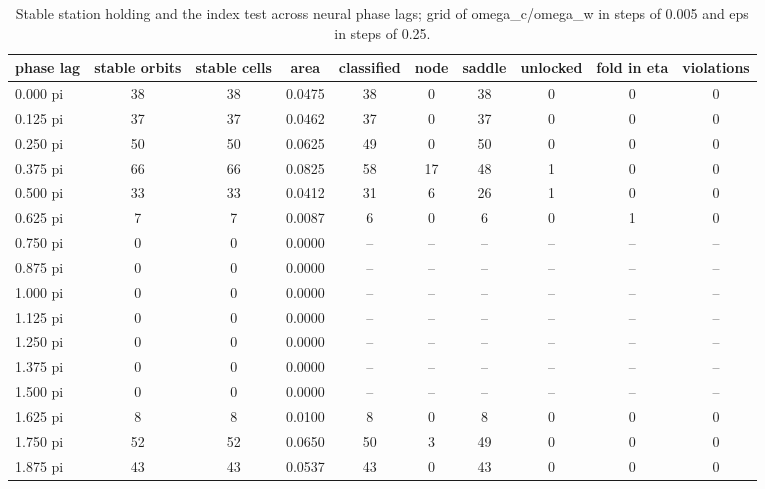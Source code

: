 \begin{table}
\caption{Stable station holding and the index test across neural phase lags; grid of omega_c/omega_w in steps of 0.005 and eps in steps of 0.25.}
\label{tab:T_phase_lag_sweep}
\begin{ruledtabular}
\begin{tabular}{lccccccccc}
phase lag & stable orbits & stable cells & area & classified & node & saddle & unlocked & fold in eta & violations \\
\hline
0.000 pi & 38 & 38 & 0.0475 & 38 & 0 & 38 & 0 & 0 & 0 \\
0.125 pi & 37 & 37 & 0.0462 & 37 & 0 & 37 & 0 & 0 & 0 \\
0.250 pi & 50 & 50 & 0.0625 & 49 & 0 & 50 & 0 & 0 & 0 \\
0.375 pi & 66 & 66 & 0.0825 & 58 & 17 & 48 & 1 & 0 & 0 \\
0.500 pi & 33 & 33 & 0.0412 & 31 & 6 & 26 & 1 & 0 & 0 \\
0.625 pi & 7 & 7 & 0.0087 & 6 & 0 & 6 & 0 & 1 & 0 \\
0.750 pi & 0 & 0 & 0.0000 & -- & -- & -- & -- & -- & -- \\
0.875 pi & 0 & 0 & 0.0000 & -- & -- & -- & -- & -- & -- \\
1.000 pi & 0 & 0 & 0.0000 & -- & -- & -- & -- & -- & -- \\
1.125 pi & 0 & 0 & 0.0000 & -- & -- & -- & -- & -- & -- \\
1.250 pi & 0 & 0 & 0.0000 & -- & -- & -- & -- & -- & -- \\
1.375 pi & 0 & 0 & 0.0000 & -- & -- & -- & -- & -- & -- \\
1.500 pi & 0 & 0 & 0.0000 & -- & -- & -- & -- & -- & -- \\
1.625 pi & 8 & 8 & 0.0100 & 8 & 0 & 8 & 0 & 0 & 0 \\
1.750 pi & 52 & 52 & 0.0650 & 50 & 3 & 49 & 0 & 0 & 0 \\
1.875 pi & 43 & 43 & 0.0537 & 43 & 0 & 43 & 0 & 0 & 0 \\
\end{tabular}
\end{ruledtabular}
\end{table}
